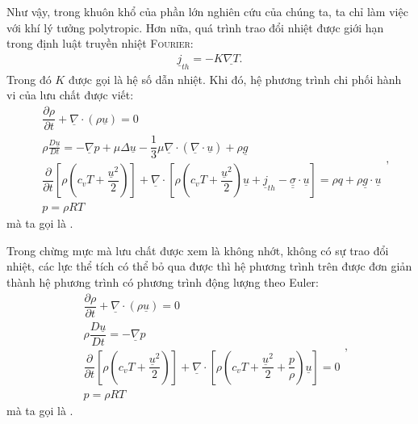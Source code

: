 \documentclass[../../../main.tex]{subfiles}
\begin{document}
    Như vậy, trong khuôn khổ của phần lớn nghiên cứu của chúng ta, ta chỉ làm việc với khí lý tưởng polytropic. Hơn nữa, quá trình trao đổi nhiệt được giới hạn trong định luật truyền nhiệt \textsc{Fourier}:
    	\begin{align}
    		\underline{j}_{th}=-K\underline{\nabla T}.
    	\end{align}
    Trong đó $K$ được gọi là hệ số dẫn nhiệt. Khi đó, hệ phương trình chi phối hành vi của lưu chất được viết:
        \begin{equation}\label{eq:reel}
            \boxed{
                \begin{aligned}
                    &\dfrac{\partial\rho}{\partial t}+\underline{\nabla}\cdot\left(\rho\underline{u}\right)=0\\[10pt]
                    &\rho\frac{D\underline{u}}{Dt}=-\underline{\nabla}p+\mu\Delta\underline{u}-\dfrac{1}{3}\mu\underline{\nabla}\cdot\left(\underline{\nabla}\cdot\underline{u}\right)+\rho\underline{g}\\[10pt]
                    &\dfrac{\partial}{\partial t}\left[\rho\left(c_vT+\dfrac{\underline{u}^2}{2}\right)\right]+\underline{\nabla}\cdot\left[\rho\left(c_vT+\dfrac{\underline{u}^2}{2}\right)\underline{u}+\underline{j}_{th}-\underline{\underline{\sigma}}\cdot\underline{u}\right]=\rho q+\rho\underline{g}\cdot\underline{u}\\[10pt]
                    &p=\rho RT
                \end{aligned}
            },
        \end{equation}
    mà ta gọi là .

    Trong chừng mực mà lưu chất được xem là không nhớt, không có sự trao đổi nhiệt, các lực thể tích có thể bỏ qua được thì hệ phương trình trên được đơn giản thành hệ phương trình có phương trình động lượng theo Euler:
        \begin{equation}\label{eq:parfait}
            \boxed{
                \begin{aligned}
                    &\dfrac{\partial\rho}{\partial t}+\underline{\nabla}\cdot\left(\rho \underline{u}\right)=0\\[10pt]
                    &\rho\dfrac{D\underline{u}}{Dt}=-\underline{\nabla}p\\[10pt]
                    &\dfrac{\partial}{\partial t}\left[\rho\left(c_vT+\dfrac{ \underline{u}^2}{2}\right)\right]+\underline{\nabla}\cdot\left[\rho\left(c_vT+\dfrac{\underline{u}^2}{2}+\dfrac{p}{\rho}\right)\underline{u} \right]=0\\[10pt]
                    &p=\rho RT
                \end{aligned}
	        },
        \end{equation}
    mà ta gọi là .
\end{document}

